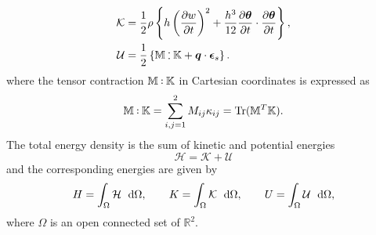 \documentclass[preprint,12pt]{elsarticle}
\DeclareMathOperator{\Tr}{Tr}
\def\onedot{$\mathsurround0pt\ldotp$}
\def\cddot{%
	\mathbin{\vcenter{\baselineskip.67ex
			\hbox{\onedot}\hbox{\onedot}}%
}}
\begin{document}
{\begin{align*}
\mathcal{K} &= \frac{1}{2} \rho \left\{ h \left(\diffp{w}{t}\right)^2 +  \frac{h^3}{12} \diffp{\bm\theta}{t} \cdot \diffp{\bm\theta}{t} \right\} ,\\
\mathcal{U} &= \frac{1}{2} \left\{ \mathbb{M} \cddot \mathbb{K} + \bm{q} \cdot \bm{\epsilon}_s \right\} .	
\end{align*} 
where the tensor contraction $ \mathbb{M} \cddot \mathbb{K}$ in Cartesian coordinates is expressed as
\[\mathbb{M} \cddot \mathbb{K} = \sum_{i,j = 1}^{2} M_{ij} \kappa_{ij} = \Tr(\mathbb{M}^T \mathbb{K}). \]
The total energy density is the sum of kinetic and potential energies
\begin{equation}
\mathcal{H} = \mathcal{K} + \mathcal{U}
\end{equation}
and the corresponding energies are given by
\begin{equation}
H = \int_{\Omega} \mathcal{H} \ \d\Omega, \qquad K = \int_{\Omega} \mathcal{K} \ \d\Omega, \qquad U = \int_{\Omega} \mathcal{U} \ \d\Omega,
\end{equation}
where $\Omega$ is an open connected set of $\mathbb{R}^2$.
}
\end{document}
